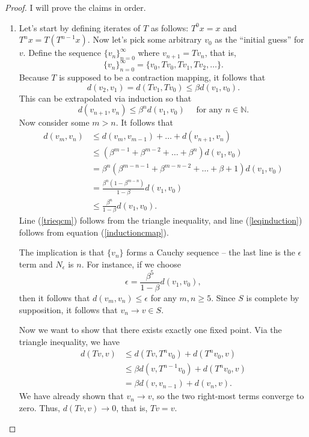 \documentclass[12pt]{article}
\newcommand{\N}{\mathbb{N}}
\theoremstyle{definition}
\begin{document}
\begin{proof} I will prove the claims in order.
\begin{enumerate}
	\item	Let's start by defining iterates of $T$ as follows: $T^0x = x$ and $T^nx = T(T^{n-1}x)$. Now let's pick some arbitrary $v_0$ as the ``initial guess'' for $v$. Define the sequence $\{v_n\}_{n=0}^{\infty}$ where $v_{n+1}=Tv_n$, that is,
		\[\{v_n\}_{n=0}^{\infty} = \{v_0, Tv_0, Tv_1, Tv_2, \hdots \}.	\]
	Because $T$ is supposed to be a contraction mapping, it follows that
		\[d(v_2, v_1) = d(Tv_1, Tv_0) \leq \beta d(v_1,v_0).	\]
	This can be extrapolated via induction so that
\begin{equation}
	d(v_{n+1}, v_n) \leq \beta^n d(v_1,v_0) \quad \text{ for any } n \in \N.	 \label{inductioncmap}
\end{equation}
	Now consider some $m > n$. It follows that
	\begin{align}
		d(v_m, v_n) &\leq d(v_m, v_{m-1}) + \hdots + d(v_{n+1}, v_n) \label{trieqcm}\\
	&\leq \left(\beta^{m-1} + \beta^{m-2} + \hdots + \beta^n	\right) d(v_1, v_0) \label{leqinduction} \\
	&= \beta^n \left(\beta^{m-n-1} + \beta^{m-n-2} + \hdots + \beta + 1	\right) d(v_1, v_0) \nonumber \\
	& =  \frac{\beta^n ( 1 - \beta^{m-n})}{1 - \beta}d(v_1, v_0) \nonumber \\
	& \leq \frac{\beta^n}{1 - \beta}d(v_1, v_0). \nonumber
	\end{align}
Line (\ref{trieqcm}) follows from the triangle inequality, and line (\ref{leqinduction}) follows from equation (\ref{inductioncmap}). 

The implication is that $\{v_n\}$ forms a Cauchy sequence -- the last line is the $\epsilon$ term and $N_{\epsilon}$ is $n$. For instance, if we choose 
	\[\epsilon = \frac{\beta^5}{1 - \beta}d(v_1, v_0),	\]
then it follows that $d(v_m, v_n) \leq \epsilon$ for any $m, n \geq 5$. Since $S$ is complete by supposition, it follows that $v_n \rightarrow v \in S$. 

Now we want to show that there exists exactly one fixed point. Via the triangle inequality, we have
	\begin{align*}
		d(Tv, v) &\leq d(Tv, T^nv_0) + d(T^n v_0, v) \\
			&\leq \beta d(v, T^{n-1}v_0) + d(T^n v_0, v) \\
			&=  \beta d(v, v_{n-1}) + d(v_n, v).
	\end{align*}
We have already shown that $v_n \rightarrow v$, so the two right-most terms converge to zero. Thus, $d(Tv,v) \rightarrow 0$, that is, $Tv=v$. 


\end{enumerate}
\end{proof}
\end{document}
